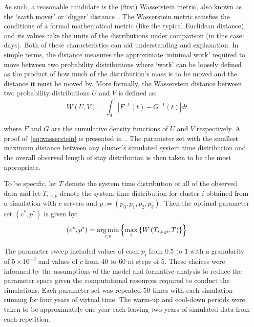 As such, a reasonable candidate is the (first) Wasserstein metric, also known as
the `earth mover' or `digger' distance~\cite{Vaserstein1969}. The Wasserstein
metric satisfies the conditions of a formal mathematical metric (like the
typical Euclidean distance), and its values take the units of the distributions
under comparison (in this case: days). Both of these characteristics can aid
understanding and explanation. In simple terms, the distance measures the
approximate `minimal work' required to move between two probability
distributions where `work' can be loosely defined as the product of how much of
the distribution's mass is to be moved and the distance it must be moved
by. More formally, the Wasserstein distance between two probability
distributions \(U\) and \(V\) is defined as:
\begin{equation}\label{eq:wasserstein}
    W(U, V) = \int_{0}^{1} \left\vert F^{-1}(t) - G^{-1}(t) \right\vert dt
\end{equation}

\noindent where \(F\) and \(G\) are the cumulative density functions of \(U\)
and \(V\) respectively. A proof of~\eqref{eq:wasserstein} is presented
in~\cite{Ramdas2017}. The parameter set with the smallest maximum distance
between any cluster's simulated system time distribution and the overall
observed length of stay distribution is then taken to be the most appropriate.

To be specific, let \(T\) denote the system time distribution of all of the
observed data and let \(T_{i,c,p}\) denote the system time distribution for
cluster \(i\) obtained from a simulation with \(c\) servers and
\(p := \left(p_0, p_1, p_2, p_3\right)\). Then the optimal parameter set
\(\left(c^*, p^*\right)\) is given by:
\begin{equation}\label{eq:parameters}
    \left(c^*, p^*\right) = \argmin_{c, p} \left\{%
        \max_{i} \left\{ W\left(T_{i,c,p}, T\right) \right\}%
    \right\}
\end{equation}

The parameter sweep included values of each \(p_i\) from \(0.5\)
to \(1\) with a granularity of \(5 \times 10^{-2}\) and values of \(c\) from
\(40\) to \(60\) at steps of \(5\).  These choices were informed by the
assumptions of the model and formative analysis to reduce the parameter space
given the computational resources required to conduct the simulations. Each
parameter set was repeated \(50\) times with each simulation running for four
years of virtual time. The warm-up and cool-down periods were taken to be
approximately one year each leaving two years of simulated data from each
repetition.

